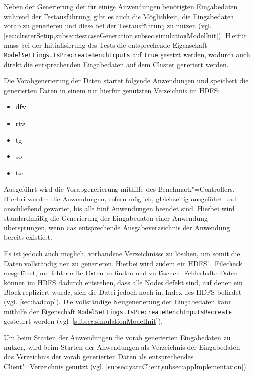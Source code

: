 Neben der Generierung der für einige Anwendungen benötigten Eingabedaten während der Testausführung, gibt es auch die Möglichkeit, die Eingabedaten vorab zu generieren und diese bei der Testausführung zu nutzen (vgl. \cref{sec:clusterSetup,subsec:testcaseGeneration,subsec:simulationModelInit}).
Hierfür muss bei der Initialisierung des Tests die entsprechende Eigenschaft \texttt{ModelSettings.IsPrecreateBenchInputs} auf \texttt{true} gesetzt werden, wodurch auch direkt die entsprechenden Eingabedaten auf dem Cluster generiert werden.

Die Vorabgenerierung der Daten startet folgende Anwendungen und speichert die generierten Daten in einem nur hierfür genutzten Verzeichnis im HDFS:

\begin{itemize}
    \item \acrlong{dfw}
    \item \acrlong{rtw}
    \item \acrlong{tg}
    \item \acrlong{so}
    \item \acrlong{tsr}
\end{itemize}

Ausgeführt wird die Vorabgenerierung mithilfe des Benchmark"=Controllers.
Hierbei werden die Anwendungen, sofern möglich, gleichzeitig ausgeführt und anschließend gewartet, bis alle fünf Anwendungen beendet sind.
Hierbei wird standardmäßig die Generierung der Eingabedaten einer Anwendung übersprungen, wenn das entsprechende Ausgabeverzeichnis der Anwendung bereits existiert.

Es ist jedoch auch möglich, vorhandene Verzeichnisse zu löschen, um somit die Daten vollständig neu zu generieren.
Hierbei wird zudem ein HDFS"=Filecheck ausgeführt, um fehlerhafte Daten zu finden und zu löschen.
Fehlerhafte Daten können im HDFS \zB dadurch entstehen, dass alle Nodes defekt sind, auf denen ein Block repliziert wurde, sich die Datei jedoch noch im Index des HDFS befindet (vgl. \cref{sec:hadoop}).
Die vollständige Neugenerierung der Eingabedaten kann mithilfe der Eigenschaft \texttt{ModelSettings.IsPrecreateBenchInputsRecreate} gesteuert werden (vgl. \cref{subsec:simulationModelInit}).

Um beim Starten der Anwendungen die vorab generierten Eingabedaten zu nutzen, wird beim Starten der Anwendungen als Verzeichnis der Eingabedaten das Verzeichnis der vorab generierten Daten als entsprechendes Client"=Verzeichnis genutzt (vgl. \cref{subsec:yarnClient,subsec:appImplementation}).
